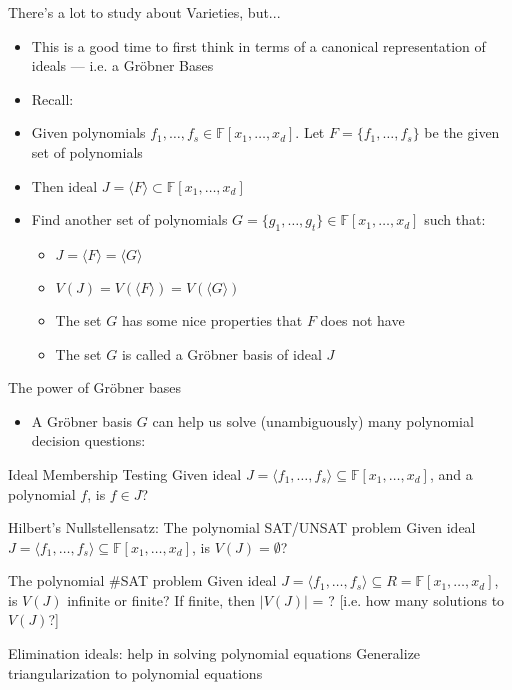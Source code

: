 \documentclass[xcolor=dvipsnames]{beamer}
\newcommand{\F}{{\mathbb{F}}}
\newcommand{\bi}{\begin{itemize}}
\newcommand{\ei}{\end{itemize}}
\begin{document}
\begin{frame}{{\large There's a lot to study about Varieties, but...}}

\bi
\item This is a good time to first think in terms of a canonical
  representation of ideals --- i.e. a \alert{Gr\"obner Bases}
\item Recall:
\item Given polynomials $f_1, \dots, f_s \in \F[x_1,\dots, x_d]$. Let
  $F = \{f_1, \dots, f_s\}$ be the given set of polynomials 
\item Then ideal $J = \langle F \rangle \subset \F[x_1, \dots, x_d]$
\item Find another set of polynomials $G = \{g_1, \dots, g_t\} \in
  \F[x_1, \dots, x_d]$ such that: 
\bi
\item $J = \langle F \rangle = \langle G \rangle$
\item $V(J) = V(\langle F \rangle) = V(\langle G \rangle)$
\item The set $G$ has some nice properties that $F$ does not have
\item The set $G$ is called a \alert{Gr\"obner basis of ideal $J$}
\ei
\ei

\end{frame}

\begin{frame}{{\large The power of Gr\"obner bases}}

\bi
\item A Gr\"obner basis $G$ can help us solve (unambiguously) many
  polynomial decision questions:
\ei

\begin{block}{Ideal Membership Testing}
Given ideal $J = \langle f_1, \dots, f_s\rangle \subseteq \F[x_1,
  \dots, x_d]$, and a polynomial $f$, is $f \in J$?
\end{block}

\begin{block}{Hilbert's Nullstellensatz: The polynomial SAT/UNSAT problem}
Given ideal $J = \langle f_1, \dots, f_s\rangle \subseteq \F[x_1,
  \dots, x_d]$, is $V(J) = \emptyset$?
\end{block}

\begin{block}{The polynomial \#SAT problem}
Given ideal $J = \langle f_1, \dots, f_s\rangle \subseteq R = \F[x_1,
  \dots, x_d]$, is $V(J)$ infinite or finite? If finite, then $|V(J)|$
= ? [i.e. how many solutions to $V(J)$?]
\end{block}

\begin{block}{Elimination ideals: help in solving polynomial
    equations}
Generalize \alert{triangularization} to polynomial equations
\end{block}

\end{frame}
\end{document}
